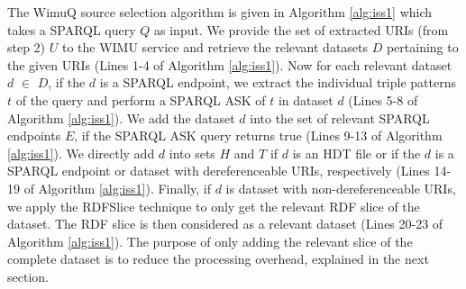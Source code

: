 The WimuQ source selection algorithm is given in Algorithm \ref{alg:iss1} which takes a SPARQL query $Q$ as input. We provide the set of extracted URIs (from step 2) $U$ to the WIMU service and retrieve the relevant datasets $D$ pertaining to the given URIs (Lines 1-4 of Algorithm \ref{alg:iss1}). Now for each relevant dataset $d$ $\in$ $D$, if the $d$ is a SPARQL endpoint, we extract the individual triple patterns $t$ of the query and perform a SPARQL ASK of $t$ in dataset $d$ (Lines 5-8 of Algorithm \ref{alg:iss1}). We add the dataset $d$ into the set of relevant SPARQL endpoints $E$, if the SPARQL ASK query returns true (Lines 9-13 of Algorithm \ref{alg:iss1}). We directly add $d$ into sets $H$ and $T$ if $d$ is an HDT file or if the $d$ is a SPARQL endpoint or dataset with dereferenceable URIs, respectively (Lines 14-19 of Algorithm \ref{alg:iss1}). Finally, if $d$ is dataset with non-dereferenceable URIs, we apply the RDFSlice \cite{marx2017torpedo} technique to only get the relevant RDF slice of the dataset. The RDF slice is then considered as a relevant dataset (Lines 20-23 of Algorithm \ref{alg:iss1}). The purpose of only adding the relevant slice of the complete dataset is to reduce the processing overhead, explained in the next section. 


